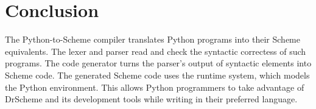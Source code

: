 \section{Conclusion}
\label{conclusion}

The Python-to-Scheme compiler translates Python programs into their Scheme equivalents.  The lexer and parser read and check the syntactic correctess of such programs.  The code generator turns the parser's output of syntactic elements into Scheme code.  The generated Scheme code uses the runtime system, which models the Python environment.  This allows Python programmers to take advantage of DrScheme and its development tools while writing in their preferred language.
